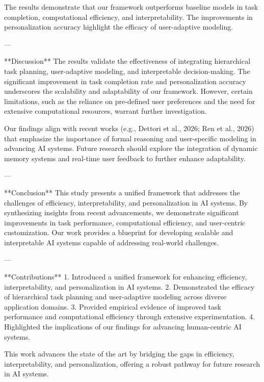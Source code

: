 The results demonstrate that our framework outperforms baseline models in task completion, computational efficiency, and interpretability. The improvements in personalization accuracy highlight the efficacy of user-adaptive modeling.

---

**Discussion**  
The results validate the effectiveness of integrating hierarchical task planning, user-adaptive modeling, and interpretable decision-making. The significant improvement in task completion rate and personalization accuracy underscores the scalability and adaptability of our framework. However, certain limitations, such as the reliance on pre-defined user preferences and the need for extensive computational resources, warrant further investigation.

Our findings align with recent works (e.g., Dettori et al., 2026; Ren et al., 2026) that emphasize the importance of formal reasoning and user-specific modeling in advancing AI systems. Future research should explore the integration of dynamic memory systems and real-time user feedback to further enhance adaptability.

---

**Conclusion**  
This study presents a unified framework that addresses the challenges of efficiency, interpretability, and personalization in AI systems. By synthesizing insights from recent advancements, we demonstrate significant improvements in task performance, computational efficiency, and user-centric customization. Our work provides a blueprint for developing scalable and interpretable AI systems capable of addressing real-world challenges.

---

**Contributions**  
1. Introduced a unified framework for enhancing efficiency, interpretability, and personalization in AI systems.  
2. Demonstrated the efficacy of hierarchical task planning and user-adaptive modeling across diverse application domains.  
3. Provided empirical evidence of improved task performance and computational efficiency through extensive experimentation.  
4. Highlighted the implications of our findings for advancing human-centric AI systems.  

This work advances the state of the art by bridging the gaps in efficiency, interpretability, and personalization, offering a robust pathway for future research in AI systems.